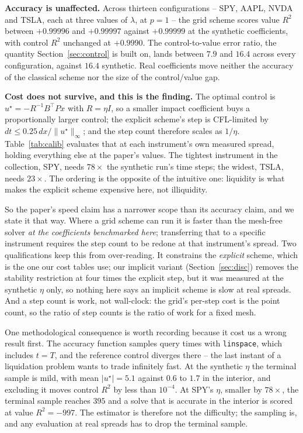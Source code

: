 \documentclass[conference]{IEEEtran}
\begin{document}
\textbf{Accuracy is unaffected.} Across thirteen configurations -- SPY, AAPL, NVDA and TSLA, each at
three values of $\lambda$, at $p = 1$ -- the grid scheme scores value $R^2$ between $+0.99996$ and
$+0.99997$ against $+0.99999$ at the synthetic coefficients, with control $R^2$ unchanged at
$+0.9990$. The control-to-value error ratio, the quantity Section~\ref{sec:control} is built on,
lands between $7.9$ and $16.4$ across every configuration, against $16.4$ synthetic. Real
coefficients move neither the accuracy of the classical scheme nor the size of the control/value gap.

\textbf{Cost does not survive, and this is the finding.} The optimal control is
$u^\star = -R^{-1}B^\top P x$ with $R = \eta I$, so a smaller impact coefficient buys a
proportionally larger control; the explicit scheme's step is CFL-limited by
$dt \le 0.25\,dx/\|u^\star\|_\infty$; and the step count therefore scales as $1/\eta$.
Table~\ref{tab:calib} evaluates that at each instrument's own measured spread, holding everything else
at the paper's values. The tightest instrument in the collection, SPY, needs $78\times$ the synthetic
run's time steps; the widest, TSLA, needs $23\times$. The ordering is the opposite of the
intuitive one: liquidity is what makes the explicit scheme expensive here, not illiquidity.

So the paper's speed claim has a narrower scope than its accuracy claim, and we state it that way.
Where a grid scheme can run it is faster than the mesh-free solver \emph{at the coefficients
benchmarked here}; transferring that to a specific instrument requires the step count to be redone at
that instrument's spread. Two qualifications keep this from over-reading. It constrains the
\emph{explicit} scheme, which is the one our cost tables use; our implicit variant
(Section~\ref{sec:disc}) removes the stability restriction at four times the explicit step, but it was
measured at the synthetic $\eta$ only, so nothing here says an implicit scheme is slow at real
spreads. And a step count is work, not wall-clock: the grid's per-step cost is the point count, so the
ratio of step counts is the ratio of work for a fixed mesh.

One methodological consequence is worth recording because it cost us a wrong result first. The
accuracy function samples query times with \texttt{linspace}, which includes $t = T$, and the
reference control diverges there -- the last instant of a liquidation problem wants to trade
infinitely fast. At the synthetic $\eta$ the terminal sample is mild, with mean $|u^\star| = 5.1$
against $0.6$ to $1.7$ in the interior, and excluding it moves control $R^2$ by less than $10^{-4}$.
At SPY's $\eta$, smaller by $78\times$, the terminal sample reaches $395$ and a solve that is accurate
in the interior is scored at value $R^2 = -997$. The estimator is therefore not the difficulty; the
sampling is, and any evaluation at real spreads has to drop the terminal sample.
\end{document}
